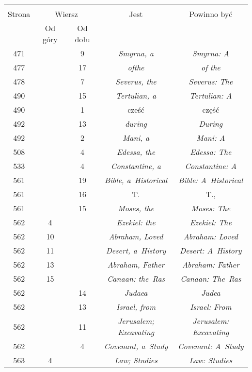 \documentclass[a4paper,11pt]{article}
\begin{document}
\begin{center}
  \begin{tabular}{|c|c|c|c|c|}
    \hline
    & \multicolumn{2}{c|}{} & & \\
    Strona & \multicolumn{2}{c|}{Wiersz} & Jest
                              & Powinno być \\ \cline{2-3}
    & Od góry & Od dołu & & \\
    \hline
    471 & &  9 & \emph{Smyrna, a} & \emph{Smyrna: A} \\
    477 & & 17 & \emph{ofthe} & \emph{of the} \\
    478 & &  7 & \emph{Severus, the} & \emph{Severus: The} \\
    490 & & 15 & \emph{Tertulian, a} & \emph{Tertulian: A} \\
    490 & &  1 & cześć & część \\
    492 & & 13 & \emph{during} & \emph{During} \\
    492 & &  2 & \emph{Mani, a} & \emph{Mani: A} \\
    508 & &  4 & \emph{Edessa, the} & \emph{Edessa: The} \\
    533 & &  4 & \emph{Constantine, a} & \emph{Constantine: A} \\
    561 & & 19 & \emph{Bible, a~Historical}
           & \emph{Bible: A~Historical} \\
    561 & & 16 & T. & T., \\
    561 & & 15 & \emph{Moses, the} & \emph{Moses: The} \\
    562 &  4 & & \emph{Ezekiel: the} & \emph{Ezekiel: The} \\
    562 & 10 & & \emph{Abraham, Loved} & \emph{Abraham: Loved} \\
    562 & 11 & & \emph{Desert, a~History} & \emph{Desert: A~History} \\
    562 & 13 & & \emph{Abraham, Father} & \emph{Abraham: Father} \\
    562 & 15 & & \emph{Canaan: the~Ras} & \emph{Canaan: The~Ras} \\
    562 & & 14 & \emph{Judaea} & \emph{Judea} \\
    562 & & 13 & \emph{Israel, from} & \emph{Israel: From} \\
    562 & & 11 & \emph{Jerusalem; Excavating}
           & \emph{Jerusalem: Excavating} \\
    562 & &  4 & \emph{Covenant, a~Study} & \emph{Covenant: A~Study} \\
    563 &  4 & & \emph{Law; Studies} & \emph{Law: Studies} \\

\end{tabular}
\end{center}
\end{document}
